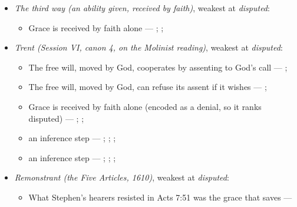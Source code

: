 \documentclass[11pt]{article}
\begin{document}
\begin{itemize}
\begin{itemize}
\item an inference step --- \cite[Trent, Session VI (1547), ch. 8]{tanner-decrees-1990}; \cite[36]{waterworth-trent-1848}; \cite[Five Arminian Articles (1610), art. 4]{schaff-creeds-christendom-3-1977}; \cite[Canons of Dort, III/IV, art. 10]{schaff-creeds-christendom-3-1977}
\end{itemize}
\item \emph{The third way (an ability given, received by faith)}, weakest at \emph{disputed}:
\begin{itemize}
\item Grace is received by faith alone --- \cite[Augsburg Confession IV.1–3]{concordia-triglotta-1921}; \cite[Sermon 1, III.1]{wesley-sermons-1872}; \cite[Trent, Session VI (1547), canon 9]{tanner-decrees-1990}
\end{itemize}
\item \emph{Trent (Session VI, canon 4, on the Molinist reading)}, weakest at \emph{disputed}:
\begin{itemize}
\item The free will, moved by God, cooperates by assenting to God’s call --- \cite[Trent, Session VI (1547), canon 4]{tanner-decrees-1990}; \cite[45]{waterworth-trent-1848}
\item The free will, moved by God, can refuse its assent if it wishes --- \cite[Trent, Session VI (1547), canon 4]{tanner-decrees-1990}; \cite[45]{waterworth-trent-1848}
\item Grace is received by faith alone (encoded as a denial, so it ranks disputed) --- \cite[Augsburg Confession IV.1–3]{concordia-triglotta-1921}; \cite[Sermon 1, III.1]{wesley-sermons-1872}; \cite[Trent, Session VI (1547), canon 9]{tanner-decrees-1990}
\item an inference step --- \cite[I-II q.111 a.2]{aquinas-summa-1920}; \cite[Canons of Dort, III/IV, art. 12]{schaff-creeds-christendom-3-1977}; \cite[Trent, Session VI (1547), canon 4]{tanner-decrees-1990}; \cite[45]{waterworth-trent-1848}
\item an inference step --- \cite[I-II q.10 a.4 ad 3]{aquinas-summa-1920}; \cite[I-II q.112 a.3]{aquinas-summa-1920}; \cite[Trent, Session VI (1547), canon 4]{tanner-decrees-1990}; \cite[45]{waterworth-trent-1848}
\end{itemize}
\item \emph{Remonstrant (the Five Articles, 1610)}, weakest at \emph{disputed}:
\begin{itemize}
\item What Stephen’s hearers resisted in Acts 7:51 was the grace that saves --- \cite[Five Arminian Articles (1610), art. 4]{schaff-creeds-christendom-3-1977}

\end{itemize}
\end{itemize}
\end{document}
